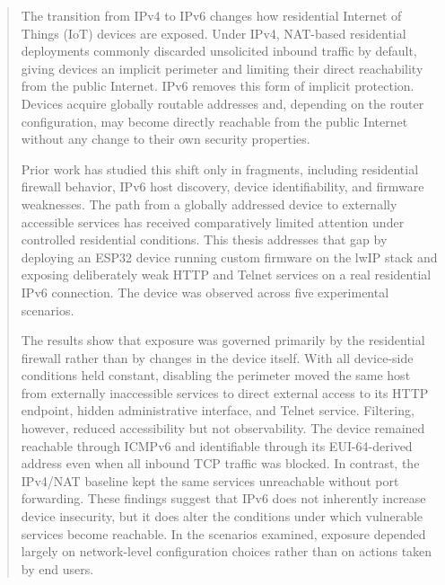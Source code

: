 \begin{abstract}
The transition from IPv4 to IPv6 changes how residential Internet of Things (IoT) devices are exposed. Under IPv4, NAT-based residential deployments commonly discarded unsolicited inbound traffic by default, giving devices an implicit perimeter and limiting their direct reachability from the public Internet. IPv6 removes this form of implicit protection. Devices acquire globally routable addresses and, depending on the router configuration, may become directly reachable from the public Internet without any change to their own security properties.

Prior work has studied this shift only in fragments, including residential firewall behavior, IPv6 host discovery, device identifiability, and firmware weaknesses. The path from a globally addressed device to externally accessible services has received comparatively limited attention under controlled residential conditions. This thesis addresses that gap by deploying an ESP32 device running custom firmware on the lwIP stack and exposing deliberately weak HTTP and Telnet services on a real residential IPv6 connection. The device was observed across five experimental scenarios.

The results show that exposure was governed primarily by the residential firewall rather than by changes in the device itself. With all device-side conditions held constant, disabling the perimeter moved the same host from externally inaccessible services to direct external access to its HTTP endpoint, hidden administrative interface, and Telnet service. Filtering, however, reduced accessibility but not observability. The device remained reachable through ICMPv6 and identifiable through its EUI-64-derived address even when all inbound TCP traffic was blocked. In contrast, the IPv4/NAT baseline kept the same services unreachable without port forwarding. These findings suggest that IPv6 does not inherently increase device insecurity, but it does alter the conditions under which vulnerable services become reachable. In the scenarios examined, exposure depended largely on network-level configuration choices rather than on actions taken by end users.
\end{abstract}
